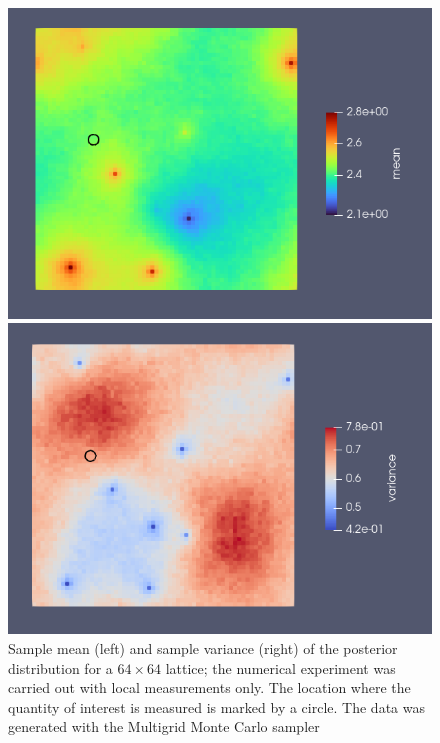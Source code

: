 \documentclass[11pt]{article}
\begin{document}
\begin{figure}
    \begin{center}
        \begin{minipage}{0.45\linewidth}
            \includegraphics[width=\linewidth]{mean.png}
        \end{minipage}
        \hfill
        \begin{minipage}{0.45\linewidth}
            \includegraphics[width=\linewidth]{variance.png}
        \end{minipage}
    \end{center}
    \caption{Sample mean (left) and sample variance (right) of the posterior distribution for a $64\times 64$ lattice; the numerical experiment was carried out with local measurements only. The location where the quantity of interest is measured is marked by a circle. The data was generated with the Multigrid Monte Carlo sampler}
    \label{fig:mean_variance}
\end{figure}
\end{document}

